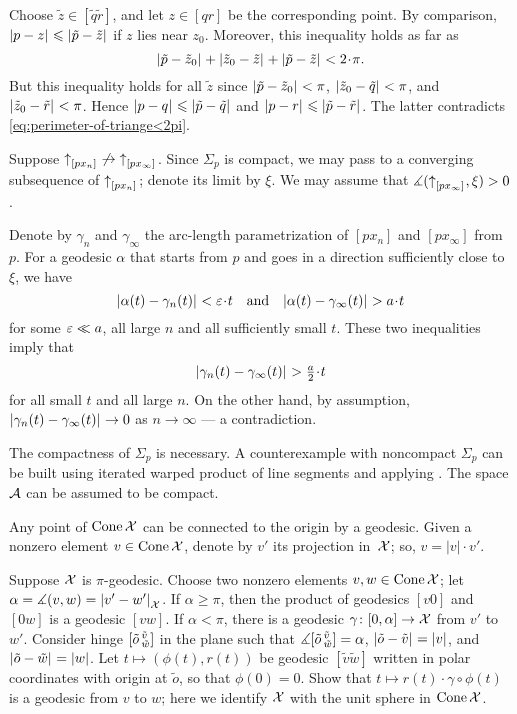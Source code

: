 Choose $\tilde z\in [\tilde q\tilde r]$,
and let $z\in [q r]$ be the corresponding point.
By comparison, $|{p}-{z}|_{}^{{}}\leqslant|{\tilde p}-{\tilde z}|_{}^{{}}$ if $z$ lies near $z_0$.
Moreover, this inequality holds as far as 
\[\dist{\tilde p}{\tilde z_0}{}+\dist{\tilde z_0}{\tilde z}{}+\dist{\tilde p}{\tilde z}{}<2\cdot\pi.\]
But this inequality holds for all $\tilde z$ since  $|{\tilde p}-{\tilde z_0}|_{}^{{}}<\pi$, $|{\tilde z_0}-{\tilde q}|_{}^{{}}<\pi$, and $|{\tilde z_0}-{\tilde r}|_{}^{{}}<\pi$.
Hence $|{p}-{q}|_{}^{{}}\leqslant|{\tilde p}-{\tilde q}|_{}^{{}}$ and $|{p}-{r}|_{}^{{}}\leqslant|{\tilde p}-{\tilde r}|_{}^{{}}$.
The latter contradicts \ref{eq:perimeter-of-triange<2pi}.

Suppose ${\uparrow}_{[{p}{x_n}]_{{}}}\not\to{\uparrow}_{[{p}{x_\infty}]_{{}}}$.
Since $\Sigma_p$ is compact, we may pass to a converging subsequence of ${\uparrow}_{[{p}{x_n}]_{{}}}$;
denote its limit by $\xi$.
We may assume that $\measuredangle ({\uparrow}_{[{p}{x_\infty}]_{{}}},\xi)>0$.

Denote by $\gamma_n$ and $\gamma_\infty$ the arc-length parametrization of $[px_n]$ and $[px_\infty]$ from $p$.
For a  geodesic $\alpha$ that starts from $p$ and goes in a direction sufficiently close to $\xi$, we have
\[\dist{\alpha(t)}{\gamma_n(t)}{}<\eps\cdot t
\quad\text{and}\quad
\dist{\alpha(t)}{\gamma_\infty(t)}{}>a\cdot t
\]
for some $\varepsilon \ll a$, all large $n$ and all sufficiently small $t$.
These two inequalities imply 
that 
\[\dist{\gamma_n(t)}{\gamma_\infty(t)}{}>\tfrac a2\cdot t\]
for all small $t$ and all large $n$.
On the other hand, by assumption, $|{\gamma_n(t)}-{\gamma_\infty(t)}|_{}^{{}}\to0$ as $n\to\infty$ --- a contradiction.

The compactness of $\Sigma_p$ is necessary.
A counterexample with noncompact  $\Sigma_p$ can be built using iterated warped product of line segments and applying \cite[Theorem 1.2]{alexander-bishop2004}.
The space $\mathcal{A}$ can be assumed to be compact.


Any point of $\mathop{\rm Cone}\nolimits \mathcal{X}$ can be connected to the origin by a geodesic.
Given a nonzero element $v\in\mathop{\rm Cone}\nolimits \mathcal{X}$, denote by $v'$ its projection in~$\mathcal{X}$; so, $v=|v|\cdot v'$.

Suppose $\mathcal{X}$ is $\pi$-geodesic.
Choose two nonzero elements $v,w\in\mathop{\rm Cone}\nolimits \mathcal{X}$; let $\alpha=\measuredangle(v,w)=|{v'}-{w'}|_{\mathcal{X}}^{{}}$.
If $\alpha\ge \pi$, then the product of geodesics $[v0]$ and $[0w]$ is a geodesic $[vw]$.
If $\alpha<\pi$, there is a geodesic $\gamma\colon[0,\alpha]\to \mathcal{X}$ from $v'$ to $w'$.
Consider hinge $[\tilde o\,{}^{\tilde v}_{\tilde w}]$ in the plane 
such that $\measuredangle[\tilde o\,{}^{\tilde v}_{\tilde w}]=\alpha$, $|{\tilde o}-{\tilde v}|_{}^{{}}=|v|$, and $|{\tilde o}-{\tilde w}|_{}^{{}}=|w|$.
Let $t\mapsto (\phi(t),r(t))$ be geodesic $[\tilde v\tilde w]$ written in polar coordinates with origin at $\tilde o$, so that $\phi(0)=0$.
Show that $t\mapsto r(t)\cdot\gamma\circ\phi(t)$ is a geodesic from $v$ to $w$;
here we identify $\mathcal{X}$ with the unit sphere in $\mathop{\rm Cone}\nolimits \mathcal{X}$.

